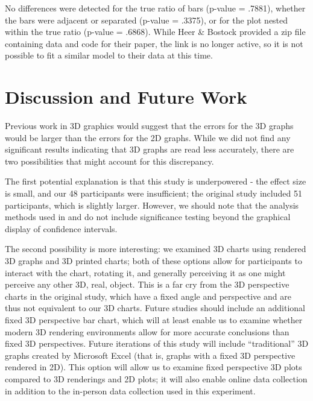 \documentclass[letterpaper,inpress,dvipsnames]{jdsart}
\begin{document}
No differences were detected for the true ratio of bars (p-value = .7881), whether the bars were adjacent or separated (p-value = .3375), or for the plot nested within the true ratio (p-value = .6868).
While Heer \& Bostock provided a zip file containing data and code for their paper, the link is no longer active, so it is not possible to fit a similar model to their data at this time.

\hypertarget{discussion-and-future-work}{%
\section{Discussion and Future Work}\label{discussion-and-future-work}}

Previous work in 3D graphics would suggest that the errors for the 3D graphs would be larger than the errors for the 2D graphs.
While we did not find any significant results indicating that 3D graphs are read less accurately, there are two possibilities that might account for this discrepancy.

The first potential explanation is that this study is underpowered - the effect size is small, and our 48 participants were insufficient; the original study included 51 participants, which is slightly larger. However, we should note that the analysis methods used in \citet{heerCrowdsourcingGraphicalPerception2010b} and \citet{cleveland_graphical_1984} do not include significance testing beyond the graphical display of confidence intervals.

The second possibility is more interesting: we examined 3D charts using rendered 3D graphs and 3D printed charts; both of these options allow for participants to interact with the chart, rotating it, and generally perceiving it as one might perceive any other 3D, real, object.
This is a far cry from the 3D perspective charts in the original study, which have a fixed angle and perspective and are thus not equivalent to our 3D charts.
Future studies should include an additional fixed 3D perspective bar chart, which will at least enable us to examine whether modern 3D rendering environments allow for more accurate conclusions than fixed 3D perspectives. Future iterations of this study will include ``traditional'' 3D graphs created by Microsoft Excel (that is, graphs with a fixed 3D perspective rendered in 2D). This option will allow us to examine fixed perspective 3D plots compared to 3D renderings and 2D plots; it will also enable online data collection in addition to the in-person data collection used in this experiment.
\end{document}
